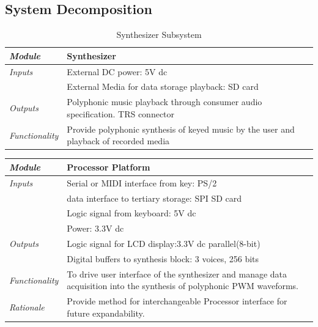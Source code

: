 \documentclass[bibtotocnumbered,abstract=on,paper=a4,fontsize=12pt,parskip=on,halfparskip=on]{scrartcl}		%
\begin{document}
  \subsection{System Decomposition}
      \begin{table}[H]
      \caption{Synthesizer Subsystem}
      \vskip 0.3cm
      \begin{tabularx}{\linewidth}{  l X }
        \textit{Module} & Synthesizer \\
        \hline
        \textit{Inputs} & External DC power: 5V dc\\
          & External Media for data storage playback: SD card\\
        \hline
        \textit{Outputs} & Polyphonic music playback through consumer audio specification. TRS connector\\
        \hline
        \textit{Functionality} & Provide polyphonic synthesis of keyed music by the user and playback of recorded media\\
      \end{tabularx}
      \end{table}
      \begin{table}[H]
      \vskip 0.3cm 
      \begin{tabularx}{\linewidth}{  l X }
        \textit{Module} & Processor Platform \\
        \hline
        \textit{Inputs} & Serial or MIDI interface from key: PS/2\\
          & data interface to tertiary storage: SPI SD card\\
          & Logic signal from keyboard: 5V dc\\
          & Power: 3.3V dc\\
        \hline
        \textit{Outputs} & Logic signal for LCD display:3.3V dc parallel(8-bit)\\
          & Digital buffers to synthesis block: 3 voices, 256 bits\\
        \hline
        \textit{Functionality} & To drive user interface of the synthesizer and manage data acquisition into the synthesis of polyphonic PWM waveforms.\\
        \hline
        \textit{Rationale} & Provide method for interchangeable Processor interface for future expandability.\\
      \end{tabularx}
      \end{table}
\end{document}
